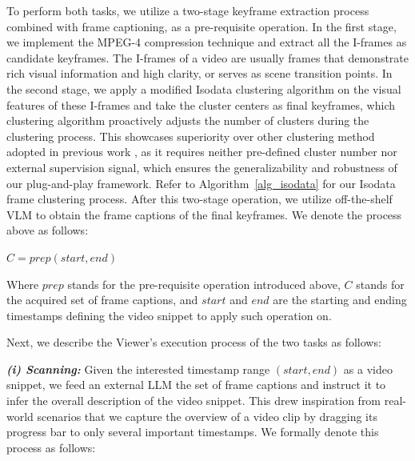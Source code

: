 To perform both tasks, we utilize a two-stage keyframe extraction process combined with frame captioning, as a pre-requisite operation. In the first stage, we implement the MPEG-4 compression technique \citep{mpeg} and extract all the I-frames  as candidate keyframes. The I-frames of a video are usually frames that demonstrate rich visual information and high clarity, or serves as scene transition points. In the second stage, we apply a modified Isodata clustering algorithm on the visual features of these I-frames and take the cluster centers as final keyframes, which clustering algorithm proactively adjusts the number of clusters during the clustering process. This showcases superiority over other clustering method adopted in previous work \citep{wang2024videotreeadaptivetreebasedvideo, clustering_knn}, as it requires neither pre-defined cluster number nor external supervision signal, which ensures the generalizability and robustness of our plug-and-play framework.  Refer to Algorithm~\ref{alg_isodata} for our Isodata frame clustering process. After this two-stage operation, we utilize off-the-shelf VLM to obtain the frame captions of the final keyframes. We denote the process above as follows: 

\begin{center}
$C = prep(start, end)$
\end{center}

Where $prep$ stands for the pre-requisite operation introduced above, $C$ stands for the acquired set of frame captions, and $start$ and $end$ are the starting and ending timestamps defining the video snippet to apply such operation on.

Next, we describe the Viewer's execution process of the two tasks as follows:

\textit{\textbf{(i) Scanning:}} Given the interested timestamp range $(start, end)$ as a video snippet, we feed an external LLM the set of frame captions and instruct it to infer the overall description of the video snippet. This drew inspiration from real-world scenarios that we capture the overview of a video clip by dragging its progress bar to only several important timestamps. We formally denote this process as follows:

